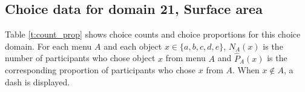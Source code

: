 \documentclass[
]{article}
\begin{document}
\pagebreak

\subsection{Choice data for domain 21, Surface
area}\label{choice-data-for-domain-21-surface-area}

Table \ref{t:count_prop} shows choice counts and choice proportions for
this choice domain. For each menu \(A\) and each object
\(x \in \{a,b,c,d,e\}\), \(N_A(x)\) is the number of participants who
chose object \(x\) from menu \(A\) and \(\hat P_A(x)\) is the
corresponding proportion of participants who chose \(x\) from \(A\).
When \(x \notin A\), a dash is displayed.

\begin{table}\centering


\end{table}
\end{document}
